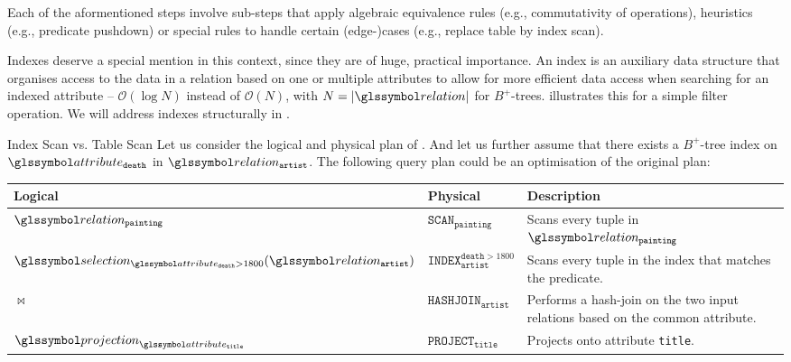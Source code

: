 Each of the aformentioned steps involve sub-steps that apply algebraic equivalence rules \cite{Garcia:2009Database}  (e.g., commutativity of operations), heuristics \cite{Garcia:2009Database,Graefe:1993Query,Swami:1989Optimization,Bruno:2010Polynomial,Tsialiamanis:2012Heuristics,} (e.g., predicate pushdown) or special rules to handle certain (edge-)cases \cite{Jarke:1984Query,Graefe:1993Query} (e.g., replace table by index scan). 

Indexes deserve a special mention in this context, since they are of huge, practical importance. An index is an auxiliary data structure that organises access to the data in a relation based on one or multiple attributes to allow for more efficient data access when searching for an indexed attribute -- $\mathcal{O}(\log N)$ instead of $\mathcal{O}(N)$, with $N = |\relation|$ for $B^{+}$-trees.  illustrates this for a simple filter operation. We will address indexes structurally in .

\begin{example}[label=example:index_scan]{Index Scan vs. Table Scan}{}
    Let us consider the logical and physical plan of . And let us further assume that there exists a  $B^{+}$-tree index on $\attribute_{\mathtt{death}}$ in $\relation_{\mathtt{artist}}$. The following query plan could be an optimisation of the original plan:

    \begin{center}
        \begin{tabular}{| l | l | p{6cm} |}
            \hline
            \textbf{Logical} & \textbf{Physical} & \textbf{Description} \\ 
            \hline
            \hline
            $\relation_{\mathtt{painting}}$ & $\mathtt{SCAN}_{\mathtt{painting}}$ & Scans every tuple in $\relation_{\mathtt{painting}}$ \\
            \hline
            $\selection_{\attribute_{\mathtt{death}} > 1800}(\relation_{\mathtt{artist}})$ & $\mathtt{INDEX}^{\mathtt{death} > 1800}_{\mathtt{artist}}$ & Scans every tuple in the index that matches the predicate. \\
            \hline
            $\Join$ & $\mathtt{HASHJOIN}_{\mathtt{artist}}$ & Performs a hash-join on the two input relations based on the common attribute. \\
            \hline
            $\projection_{\attribute_{\mathtt{title}}}$ & $\mathtt{PROJECT}_{\mathtt{title}}$ & Projects onto attribute \texttt{title}. \\
            \hline
        \end{tabular}
    \end{center}
\end{example}


